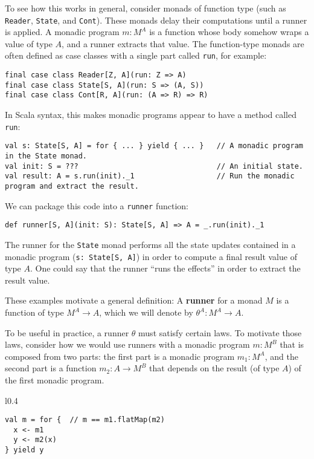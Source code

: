 To see how this works in general, consider monads of function type
(such as \lstinline!Reader!, \lstinline!State!, and \lstinline!Cont!).
These monads delay their computations until a runner is applied. A
monadic program $m:M^{A}$ is a function whose body somehow wraps
a value of type $A$, and a runner extracts that value. The function-type
monads are often defined as case classes with a single part called
\lstinline!run!, for example:
\begin{lstlisting}
final case class Reader[Z, A](run: Z => A)
final case class State[S, A](run: S => (A, S))
final case class Cont[R, A](run: (A => R) => R)
\end{lstlisting}
In Scala syntax, this makes monadic programs appear to have a method
called \lstinline!run!:
\begin{lstlisting}
val s: State[S, A] = for { ... } yield { ... }   // A monadic program in the State monad.
val init: S = ???                                // An initial state.
val result: A = s.run(init)._1                   // Run the monadic program and extract the result.
\end{lstlisting}
We can package this code into a \lstinline!runner! function:
\begin{lstlisting}
def runner[S, A](init: S): State[S, A] => A = _.run(init)._1
\end{lstlisting}
The runner for the \lstinline!State! monad performs all the state
updates contained in a monadic program (\lstinline!s: State[S, A]!)
in order to compute a final result value of type $A$. One could say
that the runner \textsf{``}runs the effects\textsf{''} in order to extract the result
value.

These examples motivate a general definition: A \textbf{runner}
for a monad $M$ is a function of type $M^{A}\rightarrow A$, which
we will denote by $\theta^{A}:M^{A}\rightarrow A$.

To be useful in practice, a runner $\theta$ must satisfy certain
laws. To motivate those laws, consider how we would use runners with
a monadic program $m:M^{B}$ that is composed from two parts: the
first part is a monadic program $m_{1}:M^{A}$, and the second part
is a function $m_{2}:A\rightarrow M^{B}$ that depends on the result
(of type $A$) of the first monadic program.

\begin{wrapfigure}{l}{0.4\columnwidth}%
\vspace{-0.85\baselineskip}

\begin{lstlisting}
val m = for {  // m == m1.flatMap(m2)
  x <- m1
  y <- m2(x)
} yield y
\end{lstlisting}
\vspace{-0.6\baselineskip}
\end{wrapfigure}%

